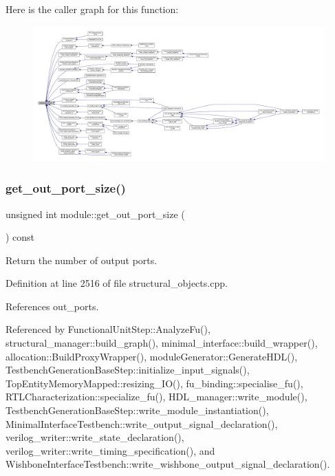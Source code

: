 Here is the caller graph for this function\+:
\nopagebreak
\begin{figure}[H]
\begin{center}
\leavevmode
\includegraphics[width=350pt]{d0/dd3/classmodule_a65622911a335dc1ddc695d49606dfc8e_icgraph}
\end{center}
\end{figure}
\mbox{\label{classmodule_af2b9fb284dad89d2d0a6d43d257ebd9e}} 
\subsubsection{\texorpdfstring{get\+\_\+out\+\_\+port\+\_\+size()}{get\_out\_port\_size()}}
{\footnotesize\ttfamily unsigned int module\+::get\+\_\+out\+\_\+port\+\_\+size (\begin{DoxyParamCaption}{ }\end{DoxyParamCaption}) const}



Return the number of output ports. 



Definition at line 2516 of file structural\+\_\+objects.\+cpp.



References out\+\_\+ports.



Referenced by Functional\+Unit\+Step\+::\+Analyze\+Fu(), structural\+\_\+manager\+::build\+\_\+graph(), minimal\+\_\+interface\+::build\+\_\+wrapper(), allocation\+::\+Build\+Proxy\+Wrapper(), module\+Generator\+::\+Generate\+H\+D\+L(), Testbench\+Generation\+Base\+Step\+::initialize\+\_\+input\+\_\+signals(), Top\+Entity\+Memory\+Mapped\+::resizing\+\_\+\+I\+O(), fu\+\_\+binding\+::specialise\+\_\+fu(), R\+T\+L\+Characterization\+::specialize\+\_\+fu(), H\+D\+L\+\_\+manager\+::write\+\_\+module(), Testbench\+Generation\+Base\+Step\+::write\+\_\+module\+\_\+instantiation(), Minimal\+Interface\+Testbench\+::write\+\_\+output\+\_\+signal\+\_\+declaration(), verilog\+\_\+writer\+::write\+\_\+state\+\_\+declaration(), verilog\+\_\+writer\+::write\+\_\+timing\+\_\+specification(), and Wishbone\+Interface\+Testbench\+::write\+\_\+wishbone\+\_\+output\+\_\+signal\+\_\+declaration().

